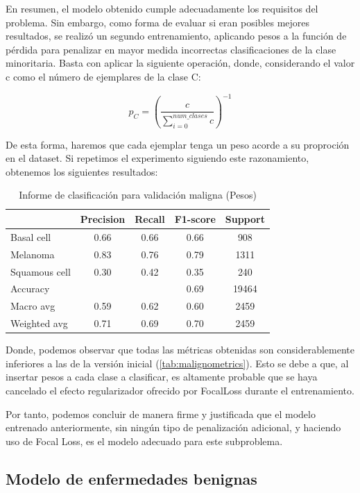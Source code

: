 En resumen, el modelo obtenido cumple adecuadamente los requisitos del problema. Sin embargo, como forma de evaluar si eran posibles mejores resultados, se realizó un segundo entrenamiento, aplicando pesos a la función de pérdida para penalizar en mayor medida incorrectas clasificaciones de la clase minoritaria. Basta con aplicar la siguiente operación, donde, considerando el valor c como el número de ejemplares de la clase C:

$$p_C =(\frac{c}{\sum_{i=0}^{num\_clases} c} )^{-1}$$

De esta forma, haremos que cada ejemplar tenga un peso acorde a su proproción en el dataset. Si repetimos el experimento siguiendo este razonamiento, obtenemos los siguientes resultados:

\begin{table}[!ht]
	\centering
	\begin{tabular}{|l|c|c|c|c|}
		\hline
		& Precision & Recall & F1-score & Support \\
		\hline
		Basal cell & 0.66 & 0.66 & 0.66 & 908 \\
		Melanoma & 0.83 & 0.76 & 0.79 & 1311 \\
		Squamous cell & 0.30 & 0.42 & 0.35 & 240 \\
		\hline
		Accuracy &  &  & 0.69 & 19464 \\
		Macro avg & 0.59& 0.62& 0.60&2459\\
		Weighted avg&0.71&0.69&0.70&2459\\
		\hline
	\end{tabular}
	\caption{Informe de clasificación para validación maligna (Pesos)}
	\label{tab:malignometrics2}
\end{table}


Donde, podemos observar que todas las métricas obtenidas son considerablemente inferiores a las de la versión inicial (\ref{tab:malignometrics}). Esto se debe a que, al insertar pesos a cada clase a clasificar, es altamente probable que se haya cancelado el efecto regularizador ofrecido por FocalLoss durante el entrenamiento.

Por tanto, podemos concluir de manera firme y justificada que el modelo entrenado anteriormente, sin ningún tipo de penalización adicional, y haciendo uso de Focal Loss, es el modelo adecuado para este subproblema.

\subsection{Modelo de enfermedades benignas}

